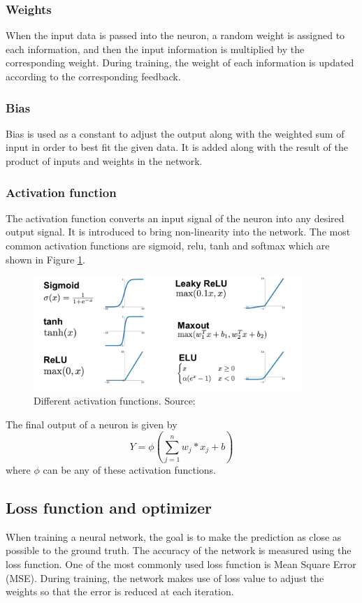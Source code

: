 \subsubsection*{Weights}

When the input data is passed into the neuron, a random weight is assigned to each information, and then the input information is multiplied by the corresponding weight. During training, the weight of each information is updated according to the corresponding feedback. 

\subsubsection*{Bias}

Bias is used as a constant to adjust the output along with the weighted sum of input in order to best fit the given data. It is added along with the result of the product of inputs and weights in the network. 

\subsubsection*{Activation function}
      The activation function converts an input signal of the neuron into any desired output signal. It is introduced to bring non-linearity into the network. The most common activation functions are sigmoid, \gls{relu}, tanh and softmax which are shown in Figure \ref{fig:activation functions}. 
\begin{figure}[H]
\centering
\includegraphics[width=4in,scale=1]{images/activation.png}
\caption[Different activation functions]{Different activation functions. Source: \citep{activation}}
\label{fig:activation functions}
\end{figure}
The final output of a neuron is given by
\begin{equation*}
      Y=\phi(\sum_{j=1}^{n}w_{j}*x_{j} + b)
\end{equation*}	
where $\phi$ can be any of these activation functions.

\subsection{Loss function and optimizer}
When training a neural network, the goal is to make the prediction as close as possible to the ground truth. The accuracy of the network is measured using the loss function. One of the most commonly used loss function is Mean Square Error (MSE). During training, the network makes use of loss value to adjust the weights so that the error is reduced at each iteration. 

